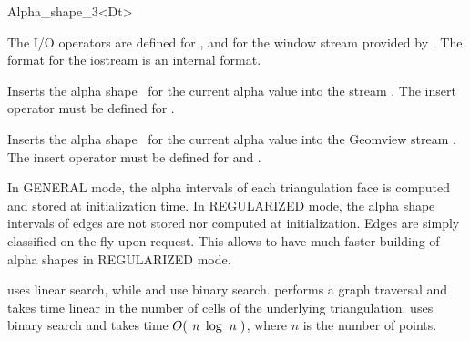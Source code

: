 \begin{ccRefClass} {Alpha_shape_3<Dt>}

The I/O operators are defined for , and for
the window stream provided by \cgal. The format for the iostream
is an internal format. 


{Inserts the alpha shape \ccVar\ for the current alpha value into the stream .
\ccPrecond The insert operator must be defined for .}



{Inserts the alpha shape \ccVar\ for the current alpha value into the Geomview stream .
\ccPrecond The insert operator must be defined for  and .}

\ccImplementation

In GENERAL mode, the alpha  intervals of each triangulation
face is computed and stored at initialization time.
In REGULARIZED mode, the alpha shape intervals of edges
are not stored nor computed at initialization.
Edges are simply classified on the fly upon request.
This allows to have much faster building of alpha shapes in
REGULARIZED mode.


 uses linear search, while 
 and  
use binary search.
 performs a graph traversal and takes time
linear in the number of cells of the underlying triangulation.
 uses binary search and takes time
$O(\mbox{ \em n } \log{\mbox{ \em n } })$, where  $n$ is the number of points.

\end{ccRefClass}


